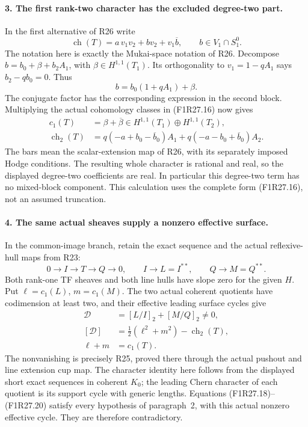 \paragraph{3. The first rank-two character has the excluded degree-two part.}
In the first alternative of R26 write
\[
       \operatorname{ch}(T)=a\,v_1v_2+bv_2+v_1\overline b,
                    \qquad b\in V_1\cap S_1^0.
 \tag{F1R27.16}
\]
The notation here is exactly the Mukai-space
notation of R26. Decompose
$b=b_0+\beta+b_2A_1$, with
$\beta\in H^{1,1}(T_1)$.
Its orthogonality to $v_1=1-qA_1$ says
$b_2-qb_0=0$. Thus
\[
             b=b_0(1+qA_1)+\beta.
 \tag{F1R27.17}
\]
The conjugate factor has the corresponding
expression in the second block. Multiplying
the actual cohomology classes in (F1R27.16)
now gives
\[
 \begin{split}
 c_1(T)&=\beta+\overline\beta
                  \in H^{1,1}(T_1)\oplus H^{1,1}(T_2),\\
 \operatorname{ch}_2(T)
     &=q(-a+b_0-\overline b_0)A_1
           +q(-a-b_0+\overline b_0)A_2.
 \end{split}
 \tag{F1R27.18}
\]
The bars mean the scalar-extension map of R26,
with its separately imposed Hodge conditions.
The resulting whole character is rational
and real, so the displayed degree-two
coefficients are real. In particular this
degree-two term has no mixed-block component.
This calculation uses the complete form
(F1R27.16), not an assumed truncation.

\paragraph{4. The same actual sheaves supply a nonzero effective surface.}
In the common-image branch, retain the exact
sequence and the actual reflexive-hull maps
from R23:
\[
 0\longrightarrow I\longrightarrow T\longrightarrow Q\longrightarrow0,
 \qquad I\longrightarrow L=I^{**},\qquad
 Q\longrightarrow M=Q^{**}.
 \tag{F1R27.19}
\]
Both rank-one TF sheaves and both line hulls
have slope zero for the given $H$.
Put $\ell=c_1(L)$, $m=c_1(M)$.
The two actual coherent quotients have
codimension at least two, and their effective
leading surface cycles give
\[
 \begin{split}
 \mathcal D&=[L/I]_2+[M/Q]_2\ne0,\\
 [\mathcal D]&=\tfrac12(\ell^2+m^2)
                         -\operatorname{ch}_2(T),\\
 \ell+m&=c_1(T).
 \end{split}
 \tag{F1R27.20}
\]
The nonvanishing is precisely R25, proved
there through the actual pushout and line
extension cup map. The character identity
here follows from the displayed short exact
sequences in coherent $K_0$; the leading
Chern character of each quotient is its
support cycle with generic lengths.
Equations (F1R27.18)--(F1R27.20) satisfy
every hypothesis of paragraph~2, with this
actual nonzero effective cycle. They are
therefore contradictory.

